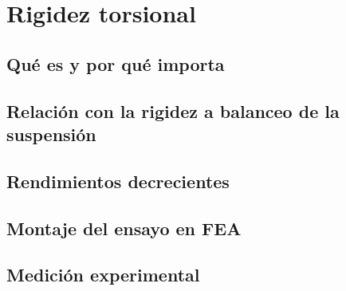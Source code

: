 \chapter{Rigidez torsional}
\label{ch:rigidez_torsional}

\begin{objetivos}
  \item {}
  \item {}
  \item {}
\end{objetivos}


\section{Qué es y por qué importa}
\label{sec:rigidez_torsional:01}

\section{Relación con la rigidez a balanceo de la suspensión}
\label{sec:rigidez_torsional:02}

\section{Rendimientos decrecientes}
\label{sec:rigidez_torsional:03}

\section{Montaje del ensayo en FEA}
\label{sec:rigidez_torsional:04}

\section{Medición experimental}
\label{sec:rigidez_torsional:05}


